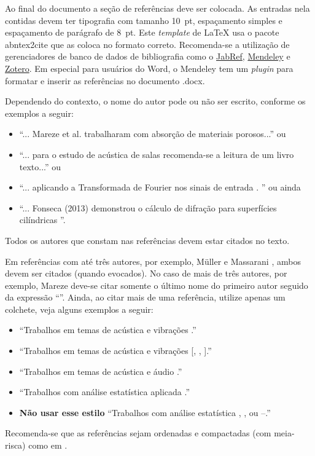 Ao final do documento a seção de referências deve ser colocada. As entradas nela contidas devem ter tipografia com tamanho 10~pt, espaçamento simples e espaçamento de parágrafo de 8~pt. Este \textit{template} de \LaTeX\xspace usa o pacote {\ttfamily abntex2cite} que as coloca no formato correto. Recomenda-se a utilização de gerenciadores de banco de dados de bibliografia como o \href{http://www.jabref.org/}{JabRef}, \href{http://www.mendeley.com}{Mendeley} e \href{https://www.zotero.org/}{Zotero}. Em especial para usuários do Word, o Mendeley tem um \textit{plugin} para formatar e inserir as referências no documento .docx.


Dependendo do contexto, o nome do autor pode ou não ser escrito, conforme os exemplos a seguir: 
%
\begin{itemize}[noitemsep,topsep=0ex] \itemsep=4pt
	\item 	``... Mareze et al. \cite{Mareze-2019} trabalharam com absorção de materiais porosos...'' ou 
	
	\item ``... para o estudo de acústica de salas \cite{Brandao-2017} recomenda-se a leitura de um livro texto...'' ou
	\item ``... aplicando a Transformada de Fourier nos sinais de entrada \cite{Oppenheim-2010}. '' ou ainda
	\item ``... Fonseca (2013) demonstrou o cálculo de difração para superfícies cilíndricas \cite{Fonseca-2013}''.
\end{itemize}
%
Todos os autores que constam nas referências devem estar citados no texto.

Em referências com até três autores, por exemplo, Müller e Massarani \cite{Muller-2001}, ambos devem ser citados (quando evocados). No caso de mais de três autores, por exemplo, Mareze \etal \cite{Mareze-2019} deve-se citar somente o último nome do primeiro autor seguido da expressão ``\etal''. Ainda, ao citar mais de uma referência, utilize apenas um colchete, veja alguns exemplos a seguir:
%
\begin{itemize}[noitemsep,topsep=0ex] \itemsep=8pt
	\item 	``Trabalhos em temas de acústica e vibrações \cite{Mareze-2017,Fonseca-2013,Brandao-2017}.''
	\item 	``Trabalhos em temas de acústica e vibrações [, , ].''
	\item ``Trabalhos em temas de acústica  e áudio \cite{Mareze-2017,Oppenheim-2010,Muller-2001,Mareze-2019}.''
	\item ``Trabalhos com análise estatística aplicada \cite{Mareze-2017, Brandao-2017, Borges-2018}.''
		\item \textbf{Não usar esse estilo} ``Trabalhos com análise estatística \cite{Mareze-2017}, \cite{Brandao-2017}, \cite{Ristow-2016} ou \cite{Mareze-2017}--\cite{Ristow-2016}.''
\end{itemize}
%
Recomenda-se que as referências sejam ordenadas e compactadas (com meia-risca) como em \cite{Mareze-2017,Oppenheim-2010,Muller-2001,Mareze-2019}.

